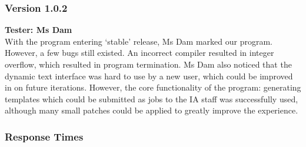 \documentclass[oneside,openany,11pt,a4paper]{report}
\begin{document}
\subsubsection{Version 1.0.2}
\textbf{Tester: Ms Dam} \\
With the program entering ‘stable’ release, Ms Dam marked our program. However, a few bugs still existed.
An incorrect compiler resulted in integer overflow, which resulted in program termination. Ms Dam also noticed that the dynamic text interface
was hard to use by a new user, which could be improved in on future iterations. However, the core functionality of the program: generating
templates which could be submitted as jobs to the IA staff was successfully used, although many small patches could be applied to greatly
improve the experience.

\subsubsection{Response Times}
\end{document}
